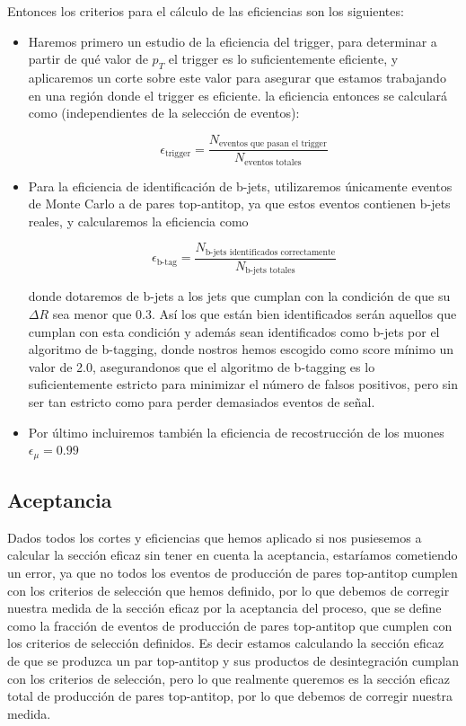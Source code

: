\documentclass[9pt,a4paper,twocolumn,twoside]{rho-class/rho}
\begin{document}
Entonces los criterios para el cálculo de las eficiencias son los siguientes:
\begin{itemize}
    \item Haremos primero un estudio de la eficiencia del trigger, para determinar a partir de qué valor de $p_T$ el trigger es lo suficientemente eficiente, y aplicaremos un corte sobre este valor para asegurar que estamos trabajando en una región donde el trigger es eficiente.
    la eficiencia entonces se calculará como (independientes de la selección de eventos):

    \begin{equation}
        \epsilon_{\text{trigger}} = \frac{N_{\text{eventos que pasan el trigger}}}{N_{\text{eventos totales}}}
    \end{equation}

    \item Para la eficiencia de identificación de b-jets, utilizaremos únicamente eventos de Monte Carlo a de pares top-antitop, ya que estos eventos contienen b-jets reales, y calcularemos la eficiencia como
    
    \begin{equation}
        \epsilon_{\text{b-tag}} = \frac{N_{\text{b-jets identificados correctamente}}}{N_{\text{b-jets totales}}}
    \end{equation}
    
    donde dotaremos de b-jets a los jets que cumplan con la condición de que su $\Delta R$ sea menor que 0.3. Así los que están bien identificados serán aquellos que cumplan con esta condición y además sean identificados como b-jets por el algoritmo de b-tagging, donde nostros hemos escogido como score mínimo un valor de 2.0, asegurandonos que el algoritmo de b-tagging es lo suficientemente estricto para minimizar el número de falsos positivos, pero sin ser tan estricto como para perder demasiados eventos de señal.

    \item Por último incluiremos también la eficiencia de recostrucción de los muones $\epsilon_{\mu} = 0.99$
\end{itemize}

\subsection{Aceptancia}

Dados todos los cortes y eficiencias que hemos aplicado si nos pusiesemos a calcular la sección eficaz sin tener en cuenta la aceptancia, estaríamos cometiendo un error, ya que no todos los eventos de producción de pares top-antitop cumplen con los criterios de selección que hemos definido, por lo que debemos de corregir nuestra medida de la sección eficaz por la aceptancia del proceso, que se define como la fracción de eventos de producción de pares top-antitop que cumplen con los criterios de selección definidos. Es decir estamos calculando la sección eficaz de que se produzca un par top-antitop y sus productos de desintegración cumplan con los criterios de selección, pero lo que realmente queremos es la sección eficaz total de producción de pares top-antitop, por lo que debemos de corregir nuestra medida.
\end{document}
